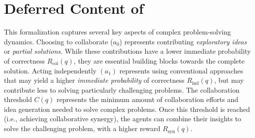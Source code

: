 \section{Deferred Content of }
\label{appendix_defproof}


\begin{remark}
\label{rmk:rationale}
\upshape
This formalization captures several key aspects of complex problem-solving dynamics. Choosing to collaborate ($a_0$) represents contributing \textit{exploratory ideas} or \textit{partial solutions}. While these contributions have a lower immediate probability of correctness \(R_{\text{col}}(q)\), they are essential building blocks towards the complete solution. Acting independently $(a_1)$ represents using conventional approaches that may yield a higher \textit{immediate probability} of correctness \(R_{\text{ind}}(q)\), but may contribute less to solving particularly challenging problems. The collaboration threshold \(C(q)\) represents the minimum amount of collaboration efforts and idea generation needed to solve complex problems. Once this threshold is reached (i.e., achieving collaborative synergy), the agents can combine their insights to solve the challenging problem, with a higher  reward \(R_{\text{syn}}(q)\).
\end{remark}

